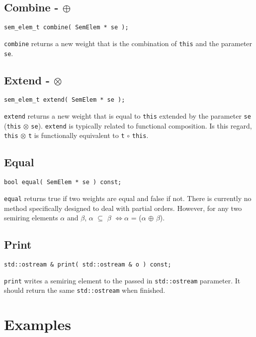 \documentclass[english,a4paper,11pt]{article}
\theoremstyle{definition}
\begin{document}
\subsection{Combine - $\oplus$}
\begin{verbatim}
sem_elem_t combine( SemElem * se );
\end{verbatim}
\verb!combine! returns a new weight that is the combination of 
\verb!this! and the parameter \verb!se!.

\subsection{Extend - $\otimes$}
\begin{verbatim}
sem_elem_t extend( SemElem * se );
\end{verbatim}
\verb!extend! returns a new weight that is 
equal to \verb!this! extended by the parameter
\verb!se! (\verb!this! $\otimes$ \verb!se!). 
\verb!extend! is typically related to functional
composition. Is this regard, \verb!this! $\otimes$ \verb!t! is functionally
equivalent to \verb!t! $\circ$ \verb!this!.

\subsection{Equal}
\begin{verbatim}
bool equal( SemElem * se ) const;
\end{verbatim}
\verb!equal! returns true if two weights are equal and
false if not. There is currently no method specifically designed to deal with
partial orders. However, for any two semiring elements 
$\alpha$ and $\beta$, $\alpha$ $\subseteq$ $\beta$ $\Leftrightarrow$$\alpha$ =
($\alpha$ $\oplus$ $\beta$).

\subsection{Print}
\begin{verbatim}
std::ostream & print( std::ostream & o ) const;
\end{verbatim}
\verb!print! writes a semiring element to the passed in
\verb!std::ostream! parameter. It should return the same
\verb!std::ostream!  when finished.


\section{Examples}
\end{document}
